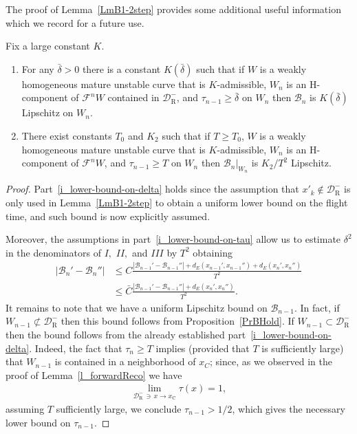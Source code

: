 \documentclass[AHL, Unicode, longabstracts,published]{cedram}
\newcommand{\crit}{\mathrm{C}}
\newcommand{\xc}{x_\crit}
\newcommand{\cB}{\mathcal{B}}
\newcommand{\pslope}{\mathcal{B}}
\newcommand{\cm}{\mathcal{F}}
\newcommand{\cell}{\mathcal{D}}
\newcommand{\brC}{\bar{C}}
\newcommand{\brdelta}{\bar{\delta}}
\newcommand{\recoPrivate}{\mathrm{R}}
\newcommand{\reco}{{\cell^-_{\recoPrivate}}}
\newcommand{\ppPrivate}[2]{#1^{#2}}
\newcommand{\prePrivate}[1]{\ppPrivate{#1}{-}}
\newcommand{\prpslope}{\prePrivate{\pslope}}
\newcommand{\admiss}{admissible}
\newcommand*\RmIII{{{I\!\!I\!\!I}}}
\newcommand*\RmII{{{I\!\!I}}}
\renewcommand{\prpslope}{\cB}
\renewcommand{\prpslope}{\cB}
\renewcommand{\prpslope}{\cB}
\newcommand*{\relabel}{\renewcommand{\labelenumi}{(\theenumi)}}
\newcommand*{\alphenumi}{\renewcommand*{\theenumi}{\alph{enumi}}\relabel}
\begin{document}
The proof of Lemma~\ref{LmB1-2step} provides some additional useful information which we record for a future use.
\begin{lemm}\label{LmBHoldAdd}
Fix a large constant $K.$
\begin{enumerate}\alphenumi
\item\label{i_lower-bound-on-delta}
For any $\brdelta > 0$ there is a constant $K(\brdelta)$ such that if $W$ is a weakly homogeneous mature unstable curve that is $K$-\admiss{}, $W_n$ is an H-component of $\cm^n W$ contained in $\reco$, and $\tau_{n-1}\geq \brdelta$ on $W_n$ then $\prpslope_n$ is $K(\brdelta)$ Lipschitz on $W_n$.
\item\label{i_lower-bound-on-tau}
There exist constants $T_0$ and $K_2$ such that if $T\geq T_0$, $W$ is a weakly homogeneous mature unstable curve that is $K$-\admiss{}, $W_n$ is an H-component of $\cm^n W$, and $\tau_{n-1}\geq T$ on $W_n$ then $\prpslope_n|_{W_n}$ is ${K_2}/{T^2}$ Lipschitz.
\end{enumerate}
\end{lemm}
\begin{proof}
Part~\eqref{i_lower-bound-on-delta} holds since the assumption that $x'_k\not\in \reco$ is only used in Lemma~\ref{LmB1-2step} to obtain a uniform lower bound on the flight time, and such bound is now explicitly assumed.

Moreover, the assumptions in part~\eqref{i_lower-bound-on-tau} allow us to estimate $\delta^2$ in the denominators of $I,$ $\RmII,$ and $\RmIII$ by $T^2$ obtaining
\begin{align*}
|\cB_{n}'-\cB_n'' | &\leq C \frac{|\cB_{n-1}'-\cB_{n-1}''|+d_E(x_{n-1}', x_{n-1}'')+d_E(x_{n}', x_{n}'')}{T^2}\\
&\leq \brC \frac{|\cB_{n-1}'-\cB_{n-1}''|+d_E(x_{n}', x_{n}'')}{T^2}.
\end{align*}
It remains to note that we have a uniform Lipschitz bound on $\prpslope_{n-1}$. In fact, if $W_{n-1}\not\subset\reco$ then this bound follows from Proposition~\ref{PrBHold}. If $W_{n-1}\subset\reco$ then the bound follows from the already established part~\eqref{i_lower-bound-on-delta}. Indeed, the fact that $\tau_n\geq T$ implies (provided that $T$ is sufficiently large) that $W_{n-1}$ is contained in a neighborhood of $x_C$; since, as we observed in the proof of Lemma~\ref{l_forwardReco} we have
\begin{align*}
\lim_{\reco\,\ni\,x\to\xc}\tau(x) = 1,
\end{align*}
assuming $T$ sufficiently large, we conclude $\tau_{n-1} > 1/2$, which gives the necessary lower bound on $\tau_{n-1}$.
\end{proof}
\end{document}
